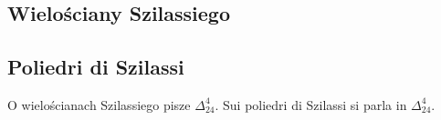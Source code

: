 


\subsection{Wielościany Szilassiego} %
\subsection{Poliedri di Szilassi} %
O wielościanach Szilassiego pisze $\Delta_{24}^4$. %
Sui poliedri di Szilassi si parla in $\Delta_{24}^4$. %




%